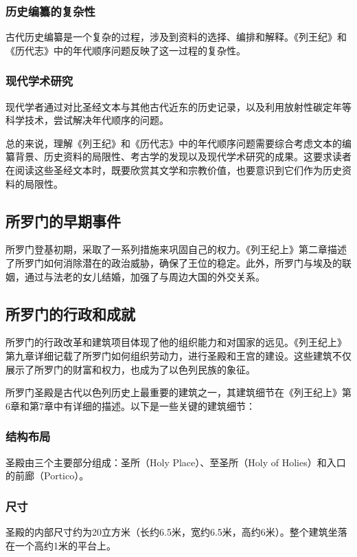 \documentclass[12pt, a4paper]{ctexart}
\begin{document}
\subsubsection{历史编纂的复杂性}
古代历史编纂是一个复杂的过程，涉及到资料的选择、编排和解释。《列王纪》和《历代志》中的年代顺序问题反映了这一过程的复杂性。

\subsubsection{现代学术研究}
现代学者通过对比圣经文本与其他古代近东的历史记录，以及利用放射性碳定年等科学技术，尝试解决年代顺序的问题。

总的来说，理解《列王纪》和《历代志》中的年代顺序问题需要综合考虑文本的编纂背景、历史资料的局限性、考古学的发现以及现代学术研究的成果。这要求读者在阅读这些圣经文本时，既要欣赏其文学和宗教价值，也要意识到它们作为历史资料的局限性。


\subsection{所罗门的早期事件}
所罗门登基初期，采取了一系列措施来巩固自己的权力。《列王纪上》第二章描述了所罗门如何消除潜在的政治威胁，确保了王位的稳定。此外，所罗门与埃及的联姻，通过与法老的女儿结婚，加强了与周边大国的外交关系。

\subsection{所罗门的行政和成就}
所罗门的行政改革和建筑项目体现了他的组织能力和对国家的远见。《列王纪上》第九章详细记载了所罗门如何组织劳动力，进行圣殿和王宫的建设。这些建筑不仅展示了所罗门的财富和权力，也成为了以色列民族的象征。

所罗门圣殿是古代以色列历史上最重要的建筑之一，其建筑细节在《列王纪上》第6章和第7章中有详细的描述。以下是一些关键的建筑细节：

\subsubsection{结构布局}
圣殿由三个主要部分组成：圣所（Holy Place）、至圣所（Holy of Holies）和入口的前廊（Portico）。

\subsubsection{尺寸}
圣殿的内部尺寸约为20立方米（长约6.5米，宽约6.5米，高约6米）。整个建筑坐落在一个高约1米的平台上。
\end{document}
